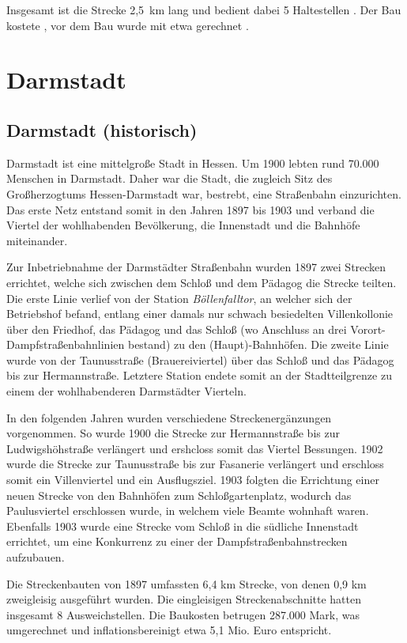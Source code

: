 Insgesamt ist die Strecke 2,5{\ }km lang und bedient dabei 5 Haltestellen \cite{FRabv}.
Der Bau kostete  \cite{FRabv2}, vor dem Bau wurde mit etwa  gerechnet \cite{FRbku}.


\section{Darmstadt}

\subsection*{Darmstadt (historisch)}

Darmstadt ist eine mittelgroße Stadt in Hessen. Um 1900 lebten rund 70.000
Menschen in Darmstadt. Daher war die Stadt, die zugleich Sitz des Großherzogtums
Hessen-Darmstadt war, bestrebt, eine Straßenbahn einzurichten. Das erste Netz
entstand somit in den Jahren 1897 bis 1903 und verband die Viertel der
wohlhabenden Bevölkerung, die Innenstadt und die Bahnhöfe miteinander. \cite{buernheim1997bahnen}

Zur Inbetriebnahme der Darmstädter Straßenbahn wurden 1897 zwei Strecken
errichtet, welche sich zwischen dem Schloß und dem Pädagog die Strecke
teilten. Die erste Linie verlief von der Station \emph{Böllenfalltor}, an
welcher sich der Betriebshof befand, entlang einer damals nur schwach
besiedelten Villenkollonie über den Friedhof, das Pädagog und das Schloß (wo
Anschluss an drei Vorort-Dampfstraßenbahnlinien bestand) zu den
(Haupt)-Bahnhöfen. Die zweite Linie wurde von der Taunusstraße (Brauereiviertel)
über das Schloß und das Pädagog bis zur Hermannstraße. Letztere Station endete
somit an der Stadtteilgrenze zu einem der wohlhabenderen Darmstädter Vierteln. \cite{hoeltge1992hessen}

In den folgenden Jahren wurden verschiedene Streckenergänzungen vorgenommen. So
wurde 1900 die Strecke zur Hermannstraße bis zur Ludwigshöhstraße verlängert und
ershcloss somit das Viertel Bessungen. 1902 wurde die Strecke zur Taunusstraße
bis zur Fasanerie verlängert und erschloss somit ein Villenviertel und ein
Ausflugsziel. 1903 folgten die Errichtung einer neuen Strecke von den Bahnhöfen
zum Schloßgartenplatz, wodurch das Paulusviertel erschlossen wurde, in welchem
viele Beamte wohnhaft waren. Ebenfalls 1903 wurde eine Strecke vom Schloß in die
südliche Innenstadt errichtet, um eine Konkurrenz zu einer der
Dampfstraßenbahnstrecken aufzubauen.

Die Streckenbauten von 1897 umfassten 6,4 km Strecke, von denen 0,9 km
zweigleisig ausgeführt wurden. Die eingleisigen Streckenabschnitte hatten
insgesamt 8 Ausweichstellen.  Die Baukosten betrugen 287.000 Mark, was
umgerechnet und inflationsbereinigt etwa 5,1 Mio. Euro entspricht. \cite{UmrechnungGoldmark}

